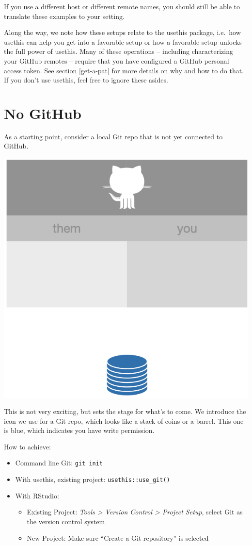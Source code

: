 \documentclass[
]{book}
\providecommand{\tightlist}{%
  \setlength{\itemsep}{0pt}\setlength{\parskip}{0pt}}
\begin{document}
If you use a different host or different remote names, you should still be able to translate these examples to your setting.

Along the way, we note how these setups relate to the usethis package, i.e.~how usethis can help you get into a favorable setup or how a favorable setup unlocks the full power of usethis.
Many of these operations -- including characterizing your GitHub remotes -- require that you have configured a GitHub personal access token.
See section \ref{get-a-pat} for more details on why and how to do that.
If you don't use usethis, feel free to ignore these asides.

\section{No GitHub}\label{no-github}

As a starting point, consider a local Git repo that is not yet connected to GitHub.

\begin{center}\includegraphics[width=0.6\linewidth]{img/no-github} \end{center}

This is not very exciting, but sets the stage for what's to come.
We introduce the icon we use for a Git repo, which looks like a stack of coins or a barrel.
This one is blue, which indicates you have write permission.

How to achieve:

\begin{itemize}
\tightlist
\item
  Command line Git: \texttt{git\ init}
\item
  With usethis, existing project: \texttt{usethis::use\_git()}
\item
  With RStudio:

  \begin{itemize}
  \tightlist
  \item
    Existing Project: \emph{Tools \textgreater{} Version Control \textgreater{} Project Setup}, select Git
    as the version control system
  \item
    New Project: Make sure ``Create a Git repository'' is selected
  \end{itemize}
\end{itemize}
\end{document}

